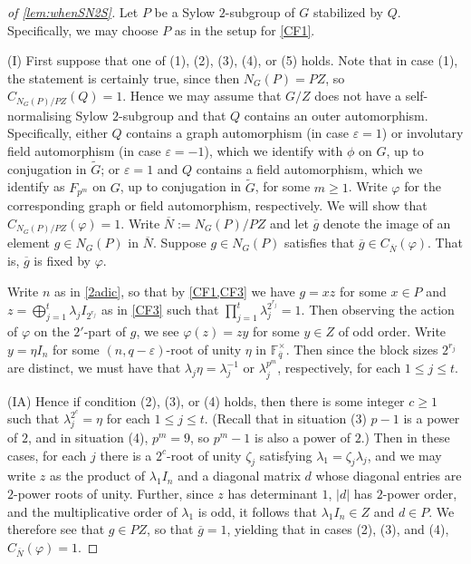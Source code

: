 \documentclass[eqthmnum, nocolour]{jt-calcs}
\renewcommand{\epsilon}{\varepsilon}
\begin{document}
\begin{proof}[of \cref{lem:whenSN2S}]
Let $P$ be a Sylow $2$-subgroup of $G$ stabilized by $Q$.  Specifically, we may choose $P$ as in the setup for \eqref{CF1}.  

(I) First suppose that one of (1), (2), (3), (4), or (5) holds.  Note that in case (1), the statement is certainly true, since then $N_G(P)=PZ$, so $C_{N_G(P)/PZ}(Q)=1$.  Hence we may assume that $G/Z$ does not have a self-normalising Sylow $2$-subgroup and that $Q$ contains an outer automorphism.  Specifically, either $Q$ contains a graph automorphism (in case $\epsilon =1$) or involutary field automorphism (in case $\epsilon = -1$), which we identify with $\phi$ on $G$, up to conjugation in $\widetilde{G}$; or $\epsilon=1$ and $Q$ contains a field automorphism, which we identify as $F_{p^m}$ on $G$, up to conjugation in $\widetilde{G}$, for some $m\geq 1$.  Write $\varphi$ for the corresponding graph or field automorphism, respectively.  We will show that $C_{N_G(P)/PZ}(\varphi)=1$.  Write $\overline{N}:=N_G(P)/PZ$ and let $\overline{g}$ denote the image of an element $g\in N_G(P)$ in $\overline{N}$.  Suppose $g\in N_G(P)$ satisfies that $\overline{g}\in C_{\overline{N}}(\varphi)$.  That is, $\overline{g}$ is fixed by $\varphi$.  

 Write $n$ as in \cref{2adic}, so that by \cref{CF1,CF3} we have $g=xz$ for some $x\in P$ and $z=\bigoplus_{j=1}^t\lambda_jI_{2^{r_j}}$ as in \eqref{CF3} such that $\prod_{j=1}^t \lambda_j^{2^{r_j}} = 1$.  Then observing the action of $\varphi$ on the $2'$-part of $g$, we see $\varphi(z)=zy$ for some $y\in Z$ of odd order.  Write $y=\eta I_{n}$ for some $(n, q-\epsilon)$-root of unity $\eta$ in $\mathbb{F}_{\overline{q}}^\times$.  Then  since the block sizes $2^{r_j}$ are distinct, we must have that $\lambda_j\eta=\lambda_j^{-1}$ or   $\lambda_j^{p^m}$, respectively, for each $1\leq j\leq t$.  

(IA) Hence if condition (2), (3), or (4) holds, then there is some integer $c\geq 1$ such that $\lambda_j^{2^c}=\eta$ for each $1\leq j\leq t$.  (Recall that in situation (3) $p-1$ is a power of $2$, and in situation (4), $p^m=9$, so $p^m-1$ is also a power of $2$.)  Then in these cases, for each $j$ there is a $2^c$-root of unity $\zeta_j$ satisfying $\lambda_1=\zeta_j\lambda_j$, and we may write $z$ as the product of $\lambda_1 I_n$ and a diagonal matrix $d$ whose diagonal entries are $2$-power roots of unity.  Further, since $z$ has determinant $1$, $|d|$ has $2$-power order, and the multiplicative order of $\lambda_1$ is odd, it follows that $\lambda_1 I_n\in Z$ and $d\in P$.  We therefore see that $g\in PZ$, so that $\overline{g}=1$, yielding that in cases (2), (3), and (4), $C_{\overline{N}}(\varphi)=1$. 


\end{proof}
\end{document}
